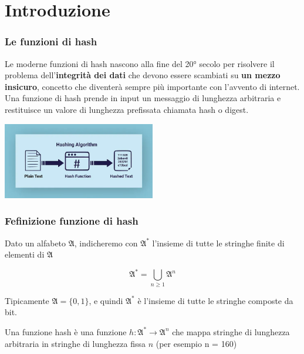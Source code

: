 
\section{Introduzione} %


\begin{frame}
\frametitle{Le funzioni di hash}

Le moderne funzioni di hash nascono alla fine del 20° secolo per risolvere il problema dell'\textbf{integrità dei dati} che devono
essere scambiati su \textbf{un mezzo insicuro}, concetto che diventerà sempre più importante con l'avvento di internet. 
Una funzione di hash prende in input un messaggio di lunghezza arbitraria e restituisce un valore di lunghezza prefissata chiamata hash o digest.

\vspace{1cm}
\begin{center}
    \includegraphics[width=0.5\textwidth]{img/1-img/hash-function.jpeg}
\end{center}
    

\end{frame}

\begin{frame}
\frametitle{Fefinizione funzione di hash}

Dato un alfabeto $\mathfrak{A}$, indicheremo con $\mathfrak{A}^*$ l’insieme di tutte le stringhe finite di elementi di $\mathfrak{A}$

\[
\mathfrak{A}^* = \bigcup_{n \geq 1} \mathfrak{A}^n
\]

Tipicamente $\mathfrak{A} = \{0, 1\}$, e quindi $\mathfrak{A}^*$ è l’insieme di tutte le stringhe composte da bit.

\vspace{1cm}
Una funzione hash è una funzione $h : \mathfrak{A}^* \rightarrow \mathfrak{A}^n$ che mappa stringhe di lunghezza arbitraria in stringhe di lunghezza fissa $n$ (per esempio n = 160)

\end{frame}


